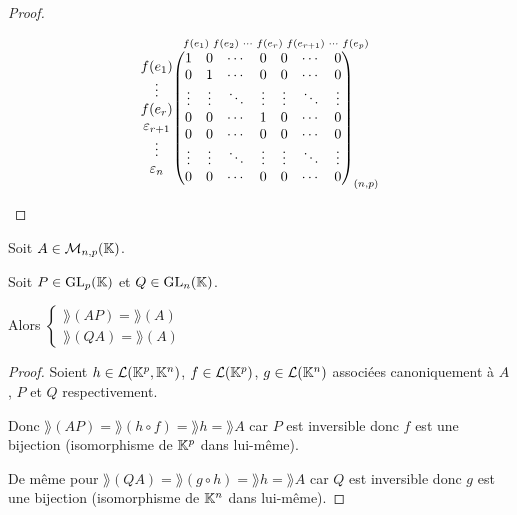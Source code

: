 \documentclass[12pt,a4paper]{report}
\begin{document}
\begin{proof}
\begin{itemize}
        $$\begin{matrix}
            f(e_1) \\
            \vdots \\
            f(e_r) \\
            \varepsilon_{r+1} \\
            \vdots \\
            \varepsilon_n
        \end{matrix}
        \overset{\scriptsize{f(e_1) ~ f(e_2) ~ \cdots ~ f(e_r) ~ f(e_{r+1}) ~ \cdots ~ f(e_p)}}{\left(\begin{matrix}
            1 & 0 & \cdots & 0 & 0 & \cdots & 0 \\
            0 & 1 & \cdots & 0 & 0 & \cdots & 0 \\
            \vdots & \vdots & \ddots & \vdots & \vdots & \ddots & \vdots \\
            0 & 0 & \cdots & 1 & 0 & \cdots & 0 \\
            0 & 0 & \cdots & 0 & 0 & \cdots & 0 \\
            \vdots & \vdots & \ddots & \vdots & \vdots & \ddots & \vdots \\
            0 & 0 & \cdots & 0 & 0 & \cdots & 0
        \end{matrix}\right)_{(n,p)}}$$
    \end{itemize}
\end{proof}

\begin{property}
    Soit $A \in \mathcal M_{n,p}(\mathbb{K})$.
    
    Soit $P \in \mathrm{GL}_p(\mathbb{K})$ et $Q \in \mathrm{GL}_n(\mathbb{K})$.

    Alors $\begin{cases} \rang(AP) = \rang(A) \\ \rang(QA) = \rang(A) \end{cases}$
\end{property}

\begin{proof}
    Soient $h \in \mathcal L(\mathbb{K}^p, \mathbb{K}^n)$, $f \in \mathcal L(\mathbb{K}^p)$, $g \in \mathcal L(\mathbb{K}^n)$ associées canoniquement à $A$, $P$ et $Q$ respectivement.

    Donc $\rang(AP) = \rang(h \circ f) = \rang h = \rang A$ car $P$ est inversible donc $f$ est une bijection (isomorphisme de $\mathbb{K}^p$ dans lui-même).

    De même pour $\rang(QA) = \rang(g \circ h) = \rang h = \rang A$ car $Q$ est inversible donc $g$ est une bijection (isomorphisme de $\mathbb{K}^n$ dans lui-même).
\end{proof}
\end{document}

